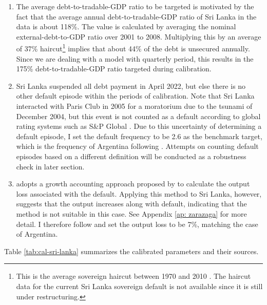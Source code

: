 \begin{enumerate}[label = (\roman*)]
    \item
    The average debt-to-tradable-GDP ratio to be targeted is motivated by the fact that the average annual debt-to-tradable-GDP ratio of Sri Lanka in the data is about 118\%.
    The value is calculated by averaging the nominal external-debt-to-GDP ratio over 2001 to 2008\footnotemark{}.
    Multiplying this by an average of 37\% haircut\footnote{This is the average sovereign haircut between 1970 and 2010 \citep{Cruces-Trebesch-13}. The haircut data for the current Sri Lanka sovereign default is not available since it is still under restructuring.} implies that about 44\% of the debt is unsecured annually\footnotemark{}.
    Since we are dealing with a model with quarterly period, this results in the 175\% debt-to-tradable-GDP ratio targeted during calibration.
    \item
    Sri Lanka suspended all debt payment in April 2022, but else there is no other default episode within the periods of calibration. Note that Sri Lanka interacted with Paris Club in 2005 for a moratorium due to the tsunami of December 2004, but this event is not counted as a default according to global rating systems such as S\&P Global \citep{SPGlobal-default-report}.
    Due to this uncertainty of determining a default episode, I set the default frequency to be 2.6 as the benchmark target, which is the frequency of Argentina following \citet{Na-18}. Attempts on counting default episodes based on a different definition will be conducted as a robustness check in later section.
    \item  \citet{Na-18} adopts a growth accounting approach proposed by \citet{zarazaga-12} to calculate the output loss associated with the default. Applying this method to Sri Lanka, however, suggests that the output increases along with default, indicating that the method is not suitable in this case. See Appendix \ref{ap: zarazaga} for more detail. I therefore follow \citet{Na-18} and set the output loss to be 7\%, matching the case of Argentina.
\end{enumerate}
Table \ref{tab:cal-sri-lanka} summarizes the calibrated parameters and their sources.

